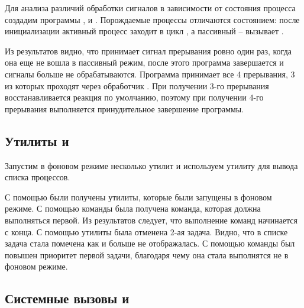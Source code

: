 Для анализа различий обработки сигналов в зависимости от состояния процесса создадим программы ,  и . Порождаемые процессы отличаются состоянием: после инициализации активный процесс заходит в цикл , а пассивный -- вызывает . 









Из результатов видно, что  принимает сигнал прерывания ровно один раз, когда она еще не вошла в пассивный режим, после этого программа завершается и сигналы  больше не обрабатываются. Программа  принимает все 4 прерывания, 3 из которых проходят через обработчик . При получении 3-го прерывания восстанавливается реакция по умолчанию, поэтому при получении 4-го прерывания выполняется принудительное завершение программы.

\subsection{Утилиты  и }

Запустим в фоновом режиме несколько утилит и используем утилиту  для вывода списка процессов.



С помощью  были получены утилиты, которые были запущены в фоновом режиме. С помощью команды  была получена команда, которая должна выполняться первой. Из результатов следует, что выполнение команд начинается с конца. С помощью утилиты  была отменена 2-ая задача. Видно, что в списке  задача стала помечена как  и больше не отображалась. С помощью команды  был повышен приоритет первой задачи, благодаря чему она стала выполнятся не в фоновом режиме.

\subsection{Системные вызовы  и }

